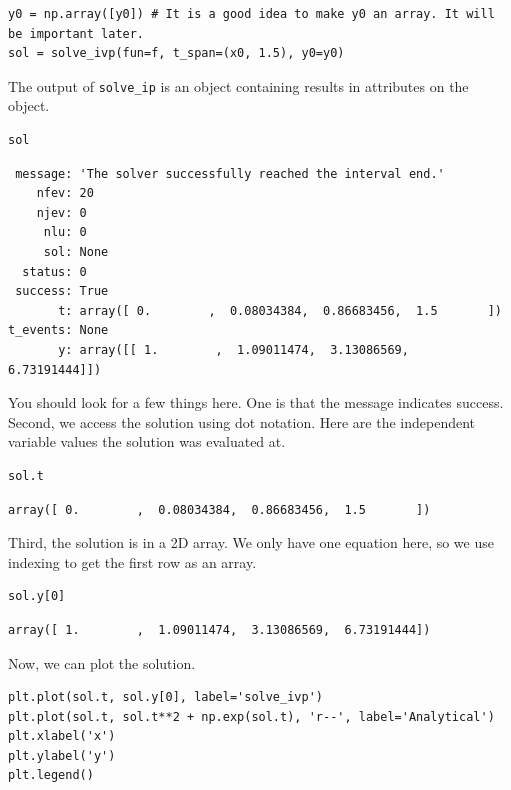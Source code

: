 \documentclass[11pt]{article}
\begin{document}
\begin{verbatim}
y0 = np.array([y0]) # It is a good idea to make y0 an array. It will be important later.
sol = solve_ivp(fun=f, t_span=(x0, 1.5), y0=y0)
\end{verbatim}

The output of \texttt{solve\_ip} is an object containing results in attributes on the object.

\begin{verbatim}
sol
\end{verbatim}

\begin{verbatim}
 message: 'The solver successfully reached the interval end.'
    nfev: 20
    njev: 0
     nlu: 0
     sol: None
  status: 0
 success: True
       t: array([ 0.        ,  0.08034384,  0.86683456,  1.5       ])
t_events: None
       y: array([[ 1.        ,  1.09011474,  3.13086569,  6.73191444]])
\end{verbatim}

You should look for a few things here. One is that the message indicates success. Second, we access the solution using dot notation. Here are the independent variable values the solution was evaluated at.

\begin{verbatim}
sol.t
\end{verbatim}

\begin{verbatim}
array([ 0.        ,  0.08034384,  0.86683456,  1.5       ])
\end{verbatim}

Third, the solution is in a 2D array. We only have one equation here, so we use indexing to get the first row as an array.

\begin{verbatim}
sol.y[0]
\end{verbatim}

\begin{verbatim}
array([ 1.        ,  1.09011474,  3.13086569,  6.73191444])
\end{verbatim}

Now, we can plot the solution.

\begin{verbatim}
plt.plot(sol.t, sol.y[0], label='solve_ivp')
plt.plot(sol.t, sol.t**2 + np.exp(sol.t), 'r--', label='Analytical')
plt.xlabel('x')
plt.ylabel('y')
plt.legend()
\end{verbatim}
\end{document}
